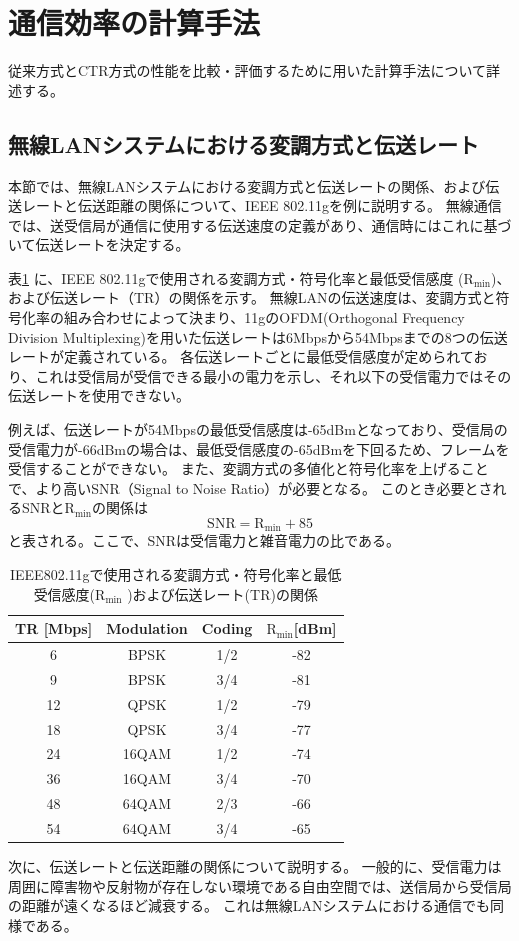 \documentclass[a4paper,10.5pt]{ltjsarticle}
\begin{document}
\section{通信効率の計算手法}
従来方式とCTR方式の性能を比較・評価するために用いた計算手法について詳述する。

\subsection{無線LANシステムにおける変調方式と伝送レート}
本節では、無線LANシステムにおける変調方式と伝送レートの関係、および伝送レートと伝送距離の関係について、IEEE 802.11gを例に説明する。
無線通信では、送受信局が通信に使用する伝送速度の定義があり、通信時にはこれに基づいて伝送レートを決定する。

表\ref{tab:IEEE802.11g_TR&Modulation} に、IEEE 802.11gで使用される変調方式・符号化率と最低受信感度 ($\mathrm{R_{\min}}$)、および伝送レート（TR）の関係を示す。
無線LANの伝送速度は、変調方式と符号化率の組み合わせによって決まり、11gのOFDM(Orthogonal Frequency Division Multiplexing)を用いた伝送レートは6Mbpsから54Mbpsまでの8つの伝送レートが定義されている。
各伝送レートごとに最低受信感度が定められており、これは受信局が受信できる最小の電力を示し、それ以下の受信電力ではその伝送レートを使用できない。

例えば、伝送レートが54Mbpsの最低受信感度は-65dBmとなっており、受信局の受信電力が-66dBmの場合は、最低受信感度の-65dBmを下回るため、フレームを受信することができない。
また、変調方式の多値化と符号化率を上げることで、より高いSNR（Signal to Noise Ratio）が必要となる。
このとき必要とされるSNRと$\mathrm{R_{\min}}$の関係は
\begin{equation}
  \mathrm{SNR} = \mathrm{R_{\min}} + 85
\end{equation}
と表される。ここで、SNRは受信電力と雑音電力の比である。
\begingroup
\setmainfont{Times New Roman} 
\begin{table}[h]
  \caption{IEEE802.11gで使用される変調方式・符号化率と最低受信感度($\mathrm{R_{\min}}$
)および伝送レート(TR)の関係}
  \centering
  \renewcommand{\arraystretch}{1.5}
  \begin{tabular}{c c c c}
    \toprule
    TR [Mbps] & Modulation & Coding & $\mathrm{R_{\min}}$[dBm] \\ 
    \midrule
    6  & BPSK  & 1/2  & -82 \\
    9  & BPSK  & 3/4  & -81 \\
    12 & QPSK  & 1/2  & -79 \\
    18 & QPSK  & 3/4  & -77 \\
    24 & 16QAM & 1/2  & -74 \\
    36 & 16QAM & 3/4  & -70 \\
    48 & 64QAM & 2/3  & -66 \\
    54 & 64QAM & 3/4  & -65 \\
    \bottomrule
  \end{tabular}
  \label{tab:IEEE802.11g_TR&Modulation} 
\end{table}
\endgroup
\noindent 
次に、伝送レートと伝送距離の関係について説明する。
一般的に、受信電力は周囲に障害物や反射物が存在しない環境である自由空間では、送信局から受信局の距離が遠くなるほど減衰する。
これは無線LANシステムにおける通信でも同様である。
\end{document}
